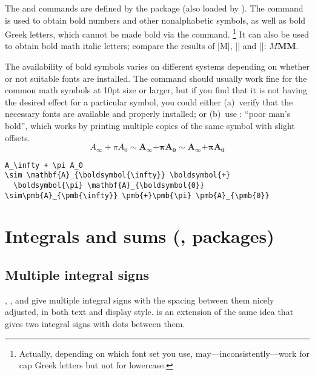 \documentclass[leqno,titlepage,openany]{amsldoc}
\begin{document}
The  and  commands
are defined by the  package (also loaded by ).
The  command is used to obtain bold numbers and other
nonalphabetic symbols, as well as bold Greek letters, which cannot be
made bold via the  command.%
\footnote{Actually, depending on which font set you use,
 may---inconsistently---work for cap Greek letters but not
for lowercase.}
It can also be used to obtain bold math italic letters; compare the
results of |M|, || and ||:
$M\mathbf{M}\boldsymbol{M}$.

The availability of bold symbols varies on different systems depending
on whether or not suitable fonts are installed. The 
command should usually work fine for the common math symbols at 10pt
size or larger, but if you find that it is not having the desired
effect for a particular symbol, you could either (a)~verify that the
necessary fonts are available and properly installed; or (b)~use
: ``poor man's bold'', which works by printing multiple copies
of the same symbol with slight offsets.
\begin{equation}
A_\infty + \pi A_0
\sim \mathbf{A}_{\boldsymbol{\infty}} \boldsymbol{+}
  \boldsymbol{\pi} \mathbf{A}_{\boldsymbol{0}}
\sim\pmb{A}_{\pmb{\infty}} \pmb{+}\pmb{\pi} \pmb{A}_{\pmb{0}}
\end{equation}
\begin{verbatim}
A_\infty + \pi A_0
\sim \mathbf{A}_{\boldsymbol{\infty}} \boldsymbol{+}
  \boldsymbol{\pi} \mathbf{A}_{\boldsymbol{0}}
\sim\pmb{A}_{\pmb{\infty}} \pmb{+}\pmb{\pi} \pmb{A}_{\pmb{0}}
\end{verbatim}


\chapter{Integrals and sums (,  packages)}

\section{Multiple integral signs}

, , and  give multiple integral
signs with the spacing between them nicely
adjusted, in both text and display style.  is an extension
of the same idea that gives two integral signs with dots between them.
\end{document}
